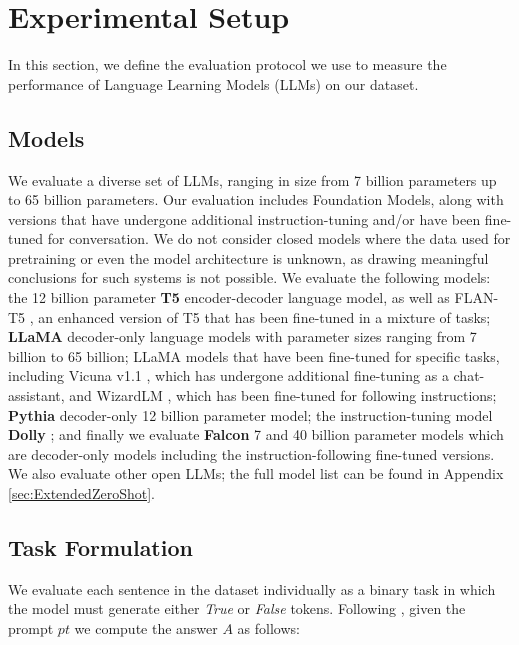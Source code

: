 \documentclass[11pt]{article}
\begin{document}
    















\section{Experimental Setup}
\label{sec:ExperimentalSetup}
In this section, we define the evaluation protocol we use to measure the performance of Language Learning Models (LLMs) on our dataset.

\subsection{Models} \label{sec:Models}
We evaluate a diverse set of LLMs, ranging in size from 7 billion parameters up to 65 billion parameters. Our evaluation includes Foundation Models, along with versions that have undergone additional instruction-tuning and/or have been fine-tuned for conversation. We do not consider closed models where the data used for pretraining or even the model architecture is unknown, as drawing meaningful conclusions for such systems is not possible. We evaluate the following models: 
the 12 billion parameter \textbf{T5} \cite{DBLP:journals/jmlr/RaffelSRLNMZLL20} encoder-decoder language model, as well as FLAN-T5 \cite{DBLP:journals/corr/abs-2210-11416}, an enhanced version of T5 that has been fine-tuned in a mixture of tasks; 
\textbf{LLaMA} \cite{DBLP:journals/corr/abs-2302-13971} decoder-only language models with parameter sizes ranging from 7 billion to 65 billion; LLaMA models that have been fine-tuned for specific tasks, including Vicuna v1.1 \cite{vicuna2023}, which has undergone additional fine-tuning as a chat-assistant, and WizardLM \cite{DBLP:journals/corr/abs-2304-12244}, which has been fine-tuned for following instructions; \textbf{Pythia} \cite{DBLP:journals/corr/abs-2304-01373} decoder-only 12 billion parameter model; the instruction-tuning model \textbf{Dolly} \cite{dolly}; and finally we evaluate \textbf{Falcon} \cite{falcon40b} 7 and 40 billion parameter models which are decoder-only models including the instruction-following fine-tuned versions. We also evaluate other open LLMs; the full model list can be found in Appendix \ref{sec:ExtendedZeroShot}.


\subsection{Task Formulation}
We evaluate each sentence in the dataset individually as a binary task in which the model must generate either \textit{True} or \textit{False} tokens. Following \citet{DBLP:journals/corr/abs-2303-16755}, given the prompt $pt$ we compute the answer $A$ as follows:
\end{document}
